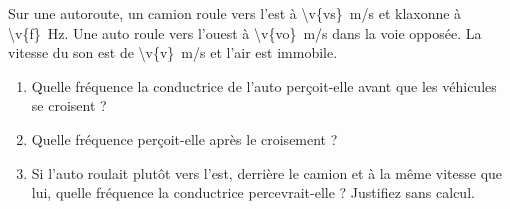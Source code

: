 Sur une autoroute, un camion roule vers l'est à \qty{\v{vs}}{m/s} et klaxonne à \qty{\v{f}}{Hz}. Une auto roule vers l'ouest à \qty{\v{vo}}{m/s} dans la voie opposée. La vitesse du son est de \qty{\v{v}}{m/s} et l'air est immobile.

\begin{enumerate}[label=\alph*)]
    \item Quelle fréquence la conductrice de l'auto perçoit-elle avant que les véhicules se croisent ?
    \item Quelle fréquence perçoit-elle après le croisement ?
    \item Si l'auto roulait plutôt vers l'est, derrière le camion et à la même vitesse que lui, quelle fréquence la conductrice percevrait-elle ? Justifiez sans calcul.
\end{enumerate}

